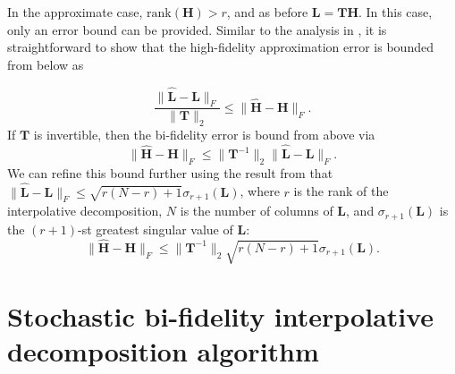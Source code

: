 \documentclass[preprint,10pt]{elsarticle}
\begin{document}
In the approximate case, $\mathrm{rank}(\bm{H}) > r$, and as before $\bm{L} = \bm{T}\bm{H}$. In this case, only an error bound can be provided. Similar to the analysis in \cite{hampton2018}, it is straightforward to show that the high-fidelity approximation error is bounded from below as

\begin{equation}
    \frac{ \| \widehat{\bm{L}} - \bm{L} \|_F}{ \|\bm{T} \|_2 } \le \| \widehat{\bm{H}} - \bm{H} \|_F .
\end{equation}
If $\bm{T}$ is invertible, then the bi-fidelity error is bound from above via
%
\begin{equation}
    \| \widehat{\bm{H}} - \bm{H} \|_F \le \| \bm{T}^{-1} \|_2 \| \widehat{\bm{L}} - \bm{L} \|_F.
\end{equation}
%
We can refine this bound further using the result from \cite{martinsson2011randomized} that $\| \widehat{\bm{L}} - \bm{L} \|_F \le \sqrt{r(N-r)+1} \sigma_{r+1}(\bm{L})$, where $r$ is the rank of the interpolative decomposition, $N$ is the number of columns of $\bm{L}$, and $\sigma_{r+1}(\bm{L})$ is the $(r+1)$-st greatest singular value of $\bm{L}$:
\begin{equation}
    \| \widehat{\bm{H}} - \bm{H} \|_F \le \| \bm{T}^{-1} \|_2 \sqrt{r(N-r)+1} \sigma_{r+1}(\bm{L}).
\end{equation}


\newpage

\section{Stochastic bi-fidelity interpolative decomposition algorithm}
\label{app:stochid}
\end{document}
